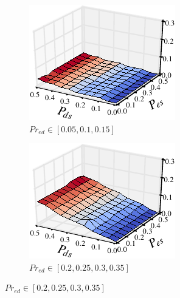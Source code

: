\begin{figure}[h!]
  \centering
  \begin{subfigure}{0.33\textwidth}
    \centering
    \includegraphics[width=\textwidth]{./figures/scripts/MutationDUTJaccard3DFigure_0_10.pdf}
    \caption{$Pr_{ed} \in [0.05, 0.1, 0.15]$}
  \end{subfigure}\hspace*{0.01\textwidth}
  \begin{subfigure}{0.33\textwidth}
    \centering
    \includegraphics[width=\textwidth]{./figures/scripts/MutationDUTJaccard3DFigure_0_30.pdf}
    \caption{$Pr_{ed} \in [0.2, 0.25, 0.3, 0.35]$}

\end{subfigure}
\end{figure}
